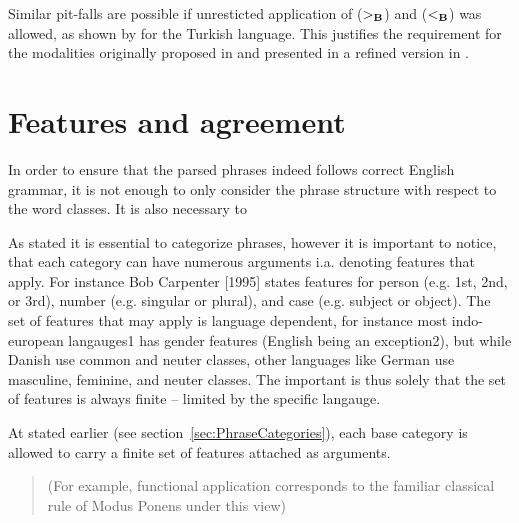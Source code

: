 Similar pit-falls are possible if unresticted application of ($>_{\bf B}$) and ($<_{\bf B}$) was allowed, as shown by \citeauthor{baldridgeThesis}  for the Turkish language. This justifies the requirement for the modalities \citeauthor{baldridgeThesis} originally proposed in  and \citeauthor{multiModalCCG} presented in a refined version in .
\clearpage

\section{Features and agreement}
In order to ensure that the parsed phrases indeed follows correct English grammar, it is not enough to only consider the phrase structure with respect to the word classes. It is also necessary to 

As stated it is essential to categorize phrases, however it is important to notice, that each category can have numerous arguments i.a. denoting features that apply. For instance Bob Carpenter [1995] states features for person (e.g. 1st, 2nd, or 3rd), number (e.g. singular or plural), and case (e.g. subject or object). The set of features that may apply is language dependent, for instance most indo-european langauges1 has gender features (English being an exception2), but while Danish use common and neuter classes, other languages like German use masculine, feminine, and neuter classes. The important is thus solely that the set of features is always finite – limited by the specific langauge. 




At stated earlier (see section~\ref{sec:PhraseCategories}), each base category is allowed to
carry a finite set of features attached as arguments.




\begin{quote}
  (For example, functional application corresponds to the familiar classical rule of Modus Ponens under this view)
\end{quote}



\cite{cs}

\clearpage








\clearpage



